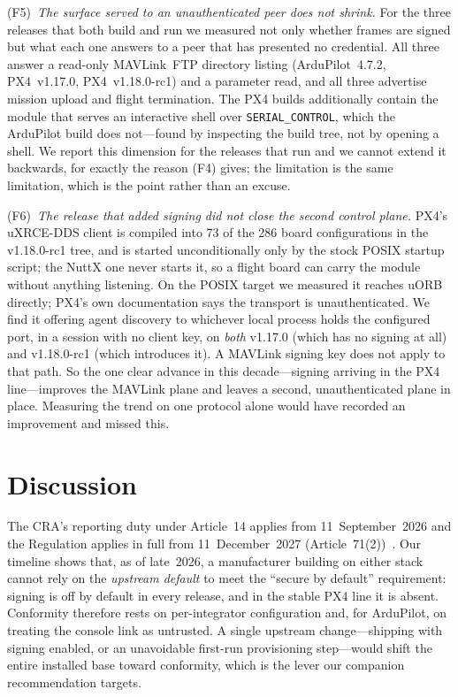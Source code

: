 \documentclass[conference]{IEEEtran}
\newcommand{\code}[1]{\texttt{#1}}
\begin{document}
(F5)~\emph{The surface served to an unauthenticated peer does not shrink.} For
the three releases that both build and run we measured not only whether frames
are signed but what each one answers to a peer that has presented no credential.
All three answer a read-only MAVLink~FTP directory listing (ArduPilot~4.7.2,
PX4~v1.17.0, PX4~v1.18.0-rc1) and a parameter read, and all three advertise
mission upload and flight termination. The PX4 builds additionally contain the
module that serves an interactive shell over \code{SERIAL\_CONTROL}, which the
ArduPilot build does not---found by inspecting the build tree, not by opening a
shell. We report this dimension for the releases that run and we cannot extend it
backwards, for exactly the reason (F4) gives; the limitation is the same
limitation, which is the point rather than an excuse.

(F6)~\emph{The release that added signing did not close the second control
plane.} PX4's uXRCE-DDS client is compiled into 73 of the 286 board configurations in the v1.18.0-rc1 tree, and is started unconditionally only by the stock POSIX startup script; the NuttX one never starts it, so a flight board can carry the module without anything listening. On the POSIX target we measured it
reaches uORB directly; PX4's own documentation says the transport is
unauthenticated. We find it offering agent discovery to whichever local process
holds the configured port, in a session with no client key, on \emph{both}
v1.17.0 (which has no signing at all) and v1.18.0-rc1 (which introduces it). A
MAVLink signing key does not apply to that path. So the one clear advance in this
decade---signing arriving in the PX4 line---improves the MAVLink plane and leaves
a second, unauthenticated plane in place. Measuring the trend on one protocol
alone would have recorded an improvement and missed this.

\section{Discussion}
\label{sec:disc}
The CRA's reporting duty under Article~14 applies from 11~September~2026 and the
Regulation applies in full from 11~December~2027 (Article~71(2))~\cite{cra2024}.
Our timeline shows that, as of late~2026, a manufacturer
building on either stack cannot rely on the \emph{upstream default} to meet the
``secure by default'' requirement: signing is off by default in every release,
and in the stable PX4 line it is absent. Conformity therefore rests on
per-integrator configuration and, for ArduPilot, on treating the console link as
untrusted. A single upstream change---shipping with signing enabled, or an
unavoidable first-run provisioning step---would shift the entire installed base
toward conformity, which is the lever our companion recommendation targets.
\end{document}
